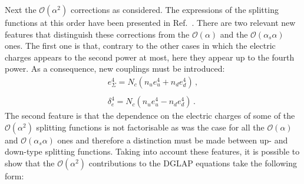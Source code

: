 Next the $\mathcal{O}(\alpha^2)$ corrections as considered.
%
The expressions of the splitting functions at this order have been
presented in Ref.~\cite{deFlorian:2016gvk}.
%
There are two relevant new features that distinguish these corrections
from the $\mathcal{O}(\alpha)$ and the $\mathcal{O}(\alpha_s\alpha)$
ones.
%
The first one is that, contrary to the other cases in which the
electric charges appears to the second power at most, here they appear
up to the fourth power.
%
As a consequence, new couplings must be introduced:
\begin{equation}
\begin{array}{l}
e_{\Sigma}^4 = N_c(n_{u} e_u^4 + n_{d} e_d^4)\,,\\
\\
\delta_e^4 = N_c(n_{u} e_u^4 - n_{d} e_d^4)\,.
\end{array}
\end{equation}
The second feature is that the dependence on the electric charges of
some of the $\mathcal{O}(\alpha^2)$ splitting functions is not
factorisable as was the case for all the $\mathcal{O}(\alpha)$ and
$\mathcal{O}(\alpha_s\alpha)$ ones and therefore a distinction must be made
 between up- and down-type splitting functions.
%
Taking into account these features, it is possible to show that the
$\mathcal{O}(\alpha^2)$ contributions to the DGLAP equations take the
following form:
